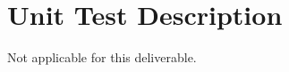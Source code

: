 \documentclass[12pt, titlepage]{article}
\begin{document}
\section{Unit Test Description}
Not applicable for this deliverable. 







\end{document}
